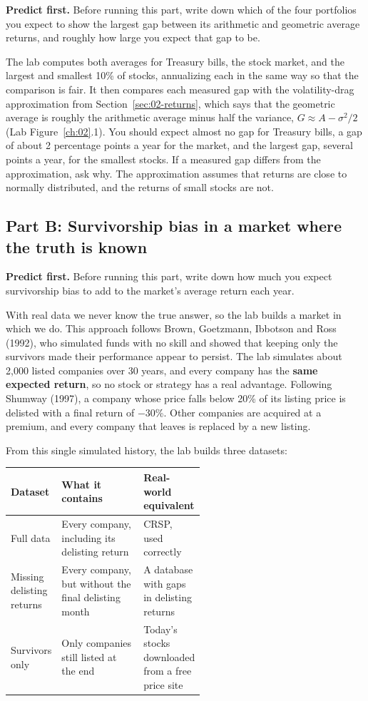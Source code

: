 \textbf{Predict first.} Before running this part, write down which of the four portfolios you expect to show the largest gap between its arithmetic and geometric average returns, and roughly how large you expect that gap to be.

The lab computes both averages for Treasury bills, the stock market, and the largest and smallest 10\% of stocks, annualizing each in the same way so that the comparison is fair. It then compares each measured gap with the volatility-drag approximation from Section~\ref{sec:02-returns}, which says that the geometric average is roughly the arithmetic average minus half the variance, $G \approx A - \sigma^2/2$ (Lab Figure~\ref{ch:02}.1). You should expect almost no gap for Treasury bills, a gap of about 2 percentage points a year for the market, and the largest gap, several points a year, for the smallest stocks. If a measured gap differs from the approximation, ask why. The approximation assumes that returns are close to normally distributed, and the returns of small stocks are not.

\subsection*{Part B: Survivorship bias in a market where the truth is known}

\textbf{Predict first.} Before running this part, write down how much you expect survivorship bias to add to the market's average return each year.

With real data we never know the true answer, so the lab builds a market in which we do. This approach follows Brown, Goetzmann, Ibbotson and Ross (1992), who simulated funds with no skill and showed that keeping only the survivors made their performance appear to persist. The lab simulates about 2,000 listed companies over 30 years, and every company has the \textbf{same expected return}, so no stock or strategy has a real advantage. Following Shumway (1997), a company whose price falls below 20\% of its listing price is delisted with a final return of $-30$\%. Other companies are acquired at a premium, and every company that leaves is replaced by a new listing.

From this single simulated history, the lab builds three datasets:

\begin{center}
\small
\begin{tabularx}{0.9\linewidth}{@{}>{\raggedright\arraybackslash}p{0.26\linewidth}>{\raggedright\arraybackslash}X>{\raggedright\arraybackslash}p{0.28\linewidth}@{}}
\toprule
Dataset & What it contains & Real-world equivalent \\
\midrule
Full data & Every company, including its delisting return & CRSP, used correctly \\
Missing delisting returns & Every company, but without the final delisting month & A database with gaps in delisting returns \\
Survivors only & Only companies still listed at the end & Today's stocks downloaded from a free price site \\
\bottomrule
\end{tabularx}
\end{center}

